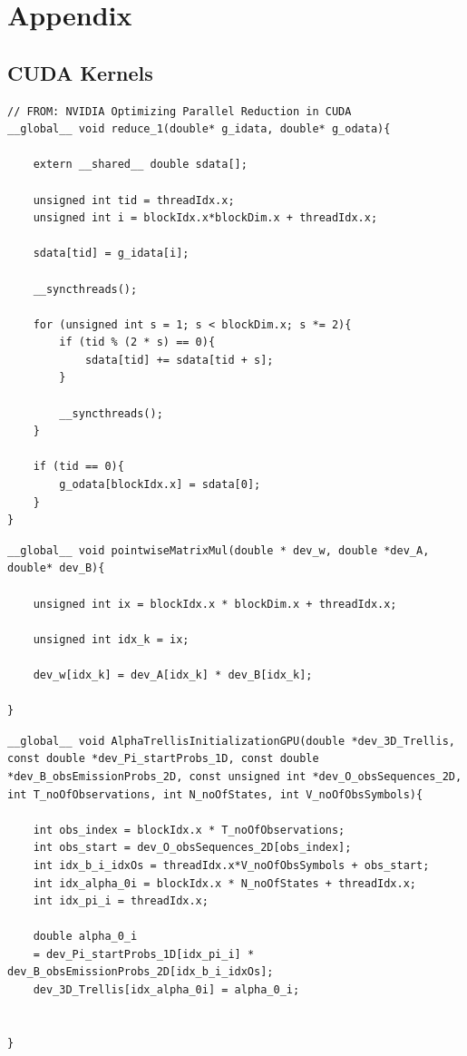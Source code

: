 \documentclass[english, paper=a4]{scrartcl}
\begin{document}
\section{Appendix}
\subsection{CUDA Kernels}

\begin{verbatim}
// FROM: NVIDIA Optimizing Parallel Reduction in CUDA
__global__ void reduce_1(double* g_idata, double* g_odata){

	extern __shared__ double sdata[];

	unsigned int tid = threadIdx.x;
	unsigned int i = blockIdx.x*blockDim.x + threadIdx.x;

	sdata[tid] = g_idata[i];

	__syncthreads();

	for (unsigned int s = 1; s < blockDim.x; s *= 2){
		if (tid % (2 * s) == 0){
			sdata[tid] += sdata[tid + s];
		}

		__syncthreads();
	}

	if (tid == 0){
		g_odata[blockIdx.x] = sdata[0];
	}
}
\end{verbatim}

\begin{verbatim}
__global__ void pointwiseMatrixMul(double * dev_w, double *dev_A, double* dev_B){

	unsigned int ix = blockIdx.x * blockDim.x + threadIdx.x;

	unsigned int idx_k = ix;

	dev_w[idx_k] = dev_A[idx_k] * dev_B[idx_k];

}
\end{verbatim}

\begin{verbatim}
__global__ void AlphaTrellisInitializationGPU(double *dev_3D_Trellis, const double *dev_Pi_startProbs_1D, const double *dev_B_obsEmissionProbs_2D, const unsigned int *dev_O_obsSequences_2D, int T_noOfObservations, int N_noOfStates, int V_noOfObsSymbols){

	int obs_index = blockIdx.x * T_noOfObservations;
	int obs_start = dev_O_obsSequences_2D[obs_index];
	int idx_b_i_idxOs = threadIdx.x*V_noOfObsSymbols + obs_start;
	int idx_alpha_0i = blockIdx.x * N_noOfStates + threadIdx.x;
	int idx_pi_i = threadIdx.x;

	double alpha_0_i 
	= dev_Pi_startProbs_1D[idx_pi_i] * dev_B_obsEmissionProbs_2D[idx_b_i_idxOs];
	dev_3D_Trellis[idx_alpha_0i] = alpha_0_i;


}
\end{verbatim}
\end{document}
